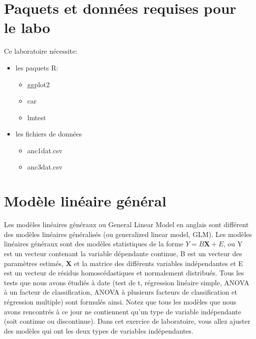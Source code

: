 \documentclass[
  12pt,
]{book}
\providecommand{\tightlist}{%
  \setlength{\itemsep}{0pt}\setlength{\parskip}{0pt}}
\begin{document}
\hypertarget{set-anco}{%
\section{Paquets et données requises pour le labo}\label{set-anco}}

Ce laboratoire nécessite:

\begin{itemize}
\tightlist
\item
  les paquets R:

  \begin{itemize}
  \tightlist
  \item
    ggplot2
  \item
    car
  \item
    lmtest
  \end{itemize}
\item
  les fichiers de données

  \begin{itemize}
  \tightlist
  \item
    anc1dat.csv
  \item
    anc3dat.csv
  \end{itemize}
\end{itemize}

\hypertarget{moduxe8le-linuxe9aire-guxe9nuxe9ral}{%
\section{Modèle linéaire général}\label{moduxe8le-linuxe9aire-guxe9nuxe9ral}}

Les modèles linéaires généraux ou General Linear Model en anglais sont différent des modèles linéaires généralisés (ou generalized linear model, GLM). Les modèles linéaires généraux sont des modèles statistiques de la forme \(Y = B \mathbf{X} + E\), ou Y est un vecteur contenant la variable dépendante continue, B est un vecteur des paramètres estimés, \(\mathbf{X}\) et la matrice des différents variables indépendantes et E est un vecteur de résidus homoscédastiques et normalement distribués. Tous les tests que nous avons étudiés à date (test de t, régression linéaire simple, ANOVA à un facteur de classification, ANOVA à plusieurs facteurs de classification et régression multiple) sont formulés ainsi. Notez que tous les modèles que nous avons rencontrés à ce jour ne contiennent qu'un type de variable indépendante (soit continue ou discontinue). Dans cet exercice de laboratoire, vous allez ajuster des modèles qui ont les deux types de variables indépendantes.
\end{document}
